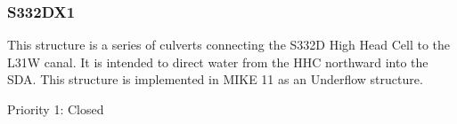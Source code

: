 
%
%


\clearpage

\subsubsection{S332DX1}
This structure is a series of culverts connecting the S332D High Head Cell to the L31W canal. It is intended to direct water from the HHC northward into the SDA. This structure is implemented in MIKE 11 as an Underflow structure.

\begin{packed_items}
\item Priority 1: Closed
\end{packed_items}

